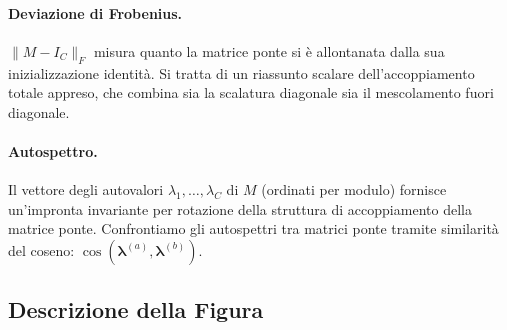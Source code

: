 \documentclass[11pt]{article}
\begin{document}
\paragraph{Deviazione di Frobenius.}
$\|M - I_C\|_F$ misura quanto la matrice ponte si \`e allontanata
dalla sua inizializzazione identit\`a.
Si tratta di un riassunto scalare dell'accoppiamento totale appreso,
che combina sia la scalatura diagonale sia il mescolamento fuori
diagonale.

\paragraph{Autospettro.}
Il vettore degli autovalori $\lambda_1, \ldots, \lambda_C$ di $M$
(ordinati per modulo) fornisce un'impronta invariante per rotazione
della struttura di accoppiamento della matrice ponte.
Confrontiamo gli autospettri tra matrici ponte tramite similarit\`a del
coseno:
$\operatorname{cos}(\boldsymbol{\lambda}^{(a)},
\boldsymbol{\lambda}^{(b)})$.

\subsection{Descrizione della Figura}
\label{sec:arch-figure}
\end{document}
